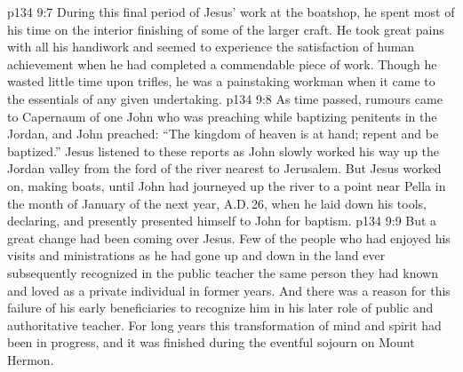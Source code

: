 \vs p134 9:7 During this final period of Jesus’ work at the boatshop, he spent most of his time on the interior finishing of some of the larger craft. He took great pains with all his handiwork and seemed to experience the satisfaction of human achievement when he had completed a commendable piece of work. Though he wasted little time upon trifles, he was a painstaking workman when it came to the essentials of any given undertaking.
\vs p134 9:8 \pc As time passed, rumours came to Capernaum of one John who was preaching while baptizing penitents in the Jordan, and John preached: “The kingdom of heaven is at hand; repent and be baptized.” Jesus listened to these reports as John slowly worked his way up the Jordan valley from the ford of the river nearest to Jerusalem. But Jesus worked on, making boats, until John had journeyed up the river to a point near Pella in the month of January of the next year, A.D.\,26, when he laid down his tools, declaring,  and presently presented himself to John for baptism.
\vs p134 9:9 But a great change had been coming over Jesus. Few of the people who had enjoyed his visits and ministrations as he had gone up and down in the land ever subsequently recognized in the public teacher the same person they had known and loved as a private individual in former years. And there was a reason for this failure of his early beneficiaries to recognize him in his later role of public and authoritative teacher. For long years this transformation of mind and spirit had been in progress, and it was finished during the eventful sojourn on Mount Hermon.
\quizlink
